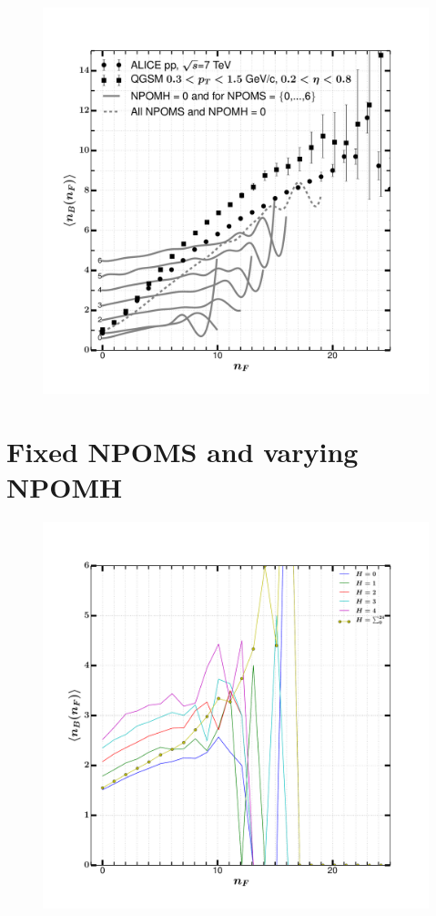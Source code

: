 \documentclass[]{article}
\begin{document}
\begin{figure}[h!]
    \centering
\includegraphics[scale=0.5]{../analyzed/nbnf_allnpoms_0npomh.pdf}
\caption{}
\end{figure}

\section*{\centering Fixed NPOMS and varying NPOMH}

\begin{figure}[h!]
    \centering
    \includegraphics[scale=0.5]{../analyzed/nbnf_fixed_s_var_h.pdf}
    \caption{}
\end{figure}
\end{document}
